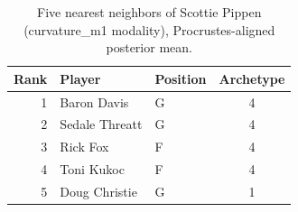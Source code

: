 \begin{table}[htbp]
  \centering\small
  \begin{tabular}{rllc}
    \toprule
    Rank & Player & Position & Archetype \\
    \midrule
    1 & Baron Davis & G & 4 \\
    2 & Sedale Threatt & G & 4 \\
    3 & Rick Fox & F & 4 \\
    4 & Toni Kukoc & F & 4 \\
    5 & Doug Christie & G & 1 \\
    \bottomrule
  \end{tabular}
  \caption{Five nearest neighbors of Scottie Pippen (curvature_m1 modality), Procrustes-aligned posterior mean.}
  \label{tab:Scottie_Pippen_neighbors_curvature_m1}
\end{table}

